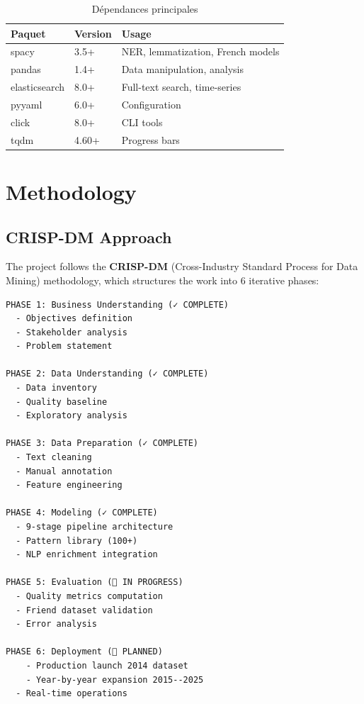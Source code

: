 \documentclass[12pt,a4paper]{report}
\begin{document}
\begin{table}[H]
\centering
\begin{tabular}{|l|l|p{5cm}|}
\hline
\textbf{Paquet} & \textbf{Version} & \textbf{Usage} \\
\hline
spacy & 3.5+ & NER, lemmatization, French models \\
pandas & 1.4+ & Data manipulation, analysis \\
elasticsearch & 8.0+ & Full-text search, time-series \\
pyyaml & 6.0+ & Configuration \\
click & 8.0+ & CLI tools \\
tqdm & 4.60+ & Progress bars \\
\hline
\end{tabular}
\caption{Dépendances principales}
\end{table}


\chapter{Methodology}

\section{CRISP-DM Approach}

The project follows the \textbf{CRISP-DM} (Cross-Industry Standard Process for Data Mining) methodology, which structures the work into 6 iterative phases:

\begin{verbatim}
PHASE 1: Business Understanding (✓ COMPLETE)
  - Objectives definition
  - Stakeholder analysis
  - Problem statement

PHASE 2: Data Understanding (✓ COMPLETE)
  - Data inventory
  - Quality baseline
  - Exploratory analysis

PHASE 3: Data Preparation (✓ COMPLETE)
  - Text cleaning
  - Manual annotation
  - Feature engineering

PHASE 4: Modeling (✓ COMPLETE)
  - 9-stage pipeline architecture
  - Pattern library (100+)
  - NLP enrichment integration

PHASE 5: Evaluation (🔄 IN PROGRESS)
  - Quality metrics computation
  - Friend dataset validation
  - Error analysis

PHASE 6: Deployment (📅 PLANNED)
    - Production launch 2014 dataset
    - Year-by-year expansion 2015--2025
  - Real-time operations
\end{verbatim}
\end{document}

